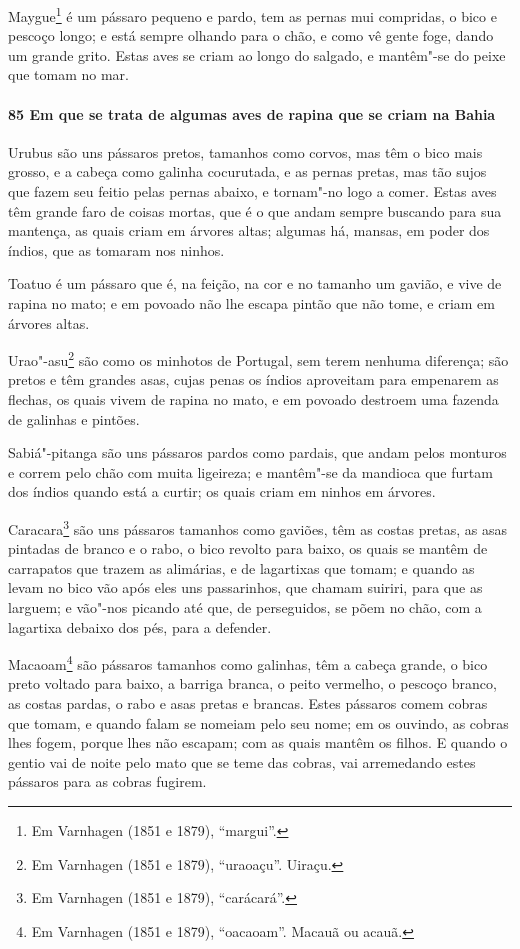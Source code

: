 Maygue\footnote{ Em Varnhagen (1851 e 1879), ``margui''.} é um pássaro pequeno e pardo,
tem as pernas mui compridas, o bico e pescoço longo; e está sempre olhando para o chão, e
como vê gente foge, dando um grande grito. Estas aves se criam ao longo do salgado, e
mantêm"-se do peixe que tomam no mar.

\paragraph{85 Em que se trata de algumas aves de rapina que se criam na Bahia}

Urubus são uns pássaros pretos, tamanhos como corvos, mas têm o bico mais grosso, e a
cabeça como galinha cocurutada, e as pernas pretas, mas tão sujos que fazem seu feitio
pelas pernas abaixo, e tornam"-no logo a comer. Estas aves têm grande faro de coisas
mortas, que é o que andam sempre buscando para sua mantença, as quais criam em árvores
altas; algumas há, mansas, em poder dos índios, que as tomaram nos ninhos.

Toatuo é um pássaro que é, na feição, na cor e no tamanho um gavião, e vive de rapina no
mato; e em povoado não lhe escapa pintão que não tome, e criam em árvores altas.

Urao"-asu\footnote{ Em Varnhagen (1851 e 1879), ``uraoaçu''. Uiraçu.} são como os minhotos
de Portugal, sem terem nenhuma diferença; são pretos e têm grandes asas, cujas penas os
índios aproveitam para empenarem as flechas, os quais vivem de rapina no mato, e em
povoado destroem uma fazenda de galinhas e pintões.

Sabiá"-pitanga são uns pássaros pardos como pardais, que andam pelos monturos e correm pelo
chão com muita ligeireza; e mantêm"-se da mandioca que furtam dos índios quando está a
curtir; os quais criam em ninhos em árvores.

Caracara\footnote{ Em Varnhagen (1851 e 1879), ``carácará''.} são uns pássaros tamanhos
como gaviões, têm as costas pretas, as asas pintadas de branco e o rabo, o bico revolto
para baixo, os quais se mantêm de carrapatos que trazem as alimárias, e de lagartixas que
tomam; e quando as levam no bico vão após eles uns passarinhos, que chamam suiriri, para
que as larguem; e vão"-nos picando até que, de perseguidos, se põem no chão, com a
lagartixa debaixo dos pés, para a defender.

Macaoam\footnote{ Em Varnhagen (1851 e 1879), ``oacaoam''. Macauã ou acauã.} são pássaros
tamanhos como galinhas, têm a cabeça grande, o bico preto voltado para baixo, a barriga
branca, o peito vermelho, o pescoço branco, as costas pardas, o rabo e asas pretas e
brancas. Estes pássaros comem cobras que tomam, e quando falam se nomeiam pelo seu nome;
em os ouvindo, as cobras lhes fogem, porque lhes não escapam; com as quais mantêm os
filhos. E quando o gentio vai de noite pelo mato que se teme das cobras, vai arremedando
estes pássaros para as cobras fugirem.

